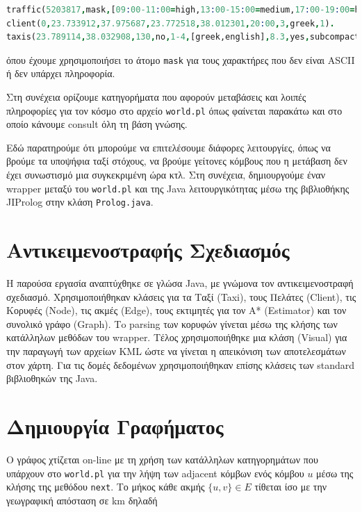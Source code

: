 \documentclass[a4paper,12pt]{article}
\begin{document}
\begin{lstlisting}[language=prolog]
traffic(5203817,mask,[09:00-11:00=high,13:00-15:00=medium,17:00-19:00=high], mask,mask).
client(0,23.733912,37.975687,23.772518,38.012301,20:00,3,greek,1).
taxis(23.789114,38.032908,130,no,1-4,[greek,english],8.3,yes,subcompact,mask).
\end{lstlisting}  

όπου έχουμε χρησιμοποιήσει το άτομο \texttt{mask} για τους χαρακτήρες που δεν είναι ASCII ή δεν υπάρχει πληροφορία. 

Στη συνέχεια ορίζουμε κατηγορήματα που αφορούν μεταβάσεις και λοιπές πληροφορίες για τον κόσμο στο αρχείο \texttt{world.pl} όπως φαίνεται παρακάτω και στο οποίο κάνουμε consult όλη τη βάση γνώσης. 



Εδώ παρατηρούμε ότι μπορούμε να επιτελέσουμε διάφορες λειτουργίες, όπως να βρούμε τα υποψήφια ταξί στόχους, να βρούμε γείτονες κόμβους που η μετάβαση δεν έχει συνωστισμό μια συγκεκριμένη ώρα κτλ. Στη συνέχεια, δημιουργούμε έναν wrapper μεταξύ του \texttt{world.pl} και της Java λειτουργικότητας μέσω της βιβλιοθήκης JIProlog στην κλάση \texttt{Prolog.java}. 

\section{Αντικειμενοστραφής Σχεδιασμός} 

Η παρούσα εργασία αναπτύχθηκε σε γλώσα Java, με γνώμονα τον αντικειμενοστραφή σχεδιασμό. Χρησιμοποιήθηκαν κλάσεις για τα Ταξί (Taxi), τους Πελάτες (Client), τις Κορυφές (Node), τις ακμές (Edge), τους εκτιμητές για τον Α* (Estimator) και τον συνολικό γράφο (Graph). Τo parsing των κορυφών γίνεται μέσω της κλήσης των κατάλληλων μεθόδων του wrapper. Τέλος χρησιμοποιήθηκε μια κλάση (Visual) για την παραγωγή των αρχείων KML ώστε να γίνεται η απεικόνιση των αποτελεσμάτων στον χάρτη. Για τις δομές δεδομένων χρησιμοποιήθηκαν επίσης κλάσεις των standard βιβλιοθηκών της Java. 

\section{Δημιουργία Γραφήματος}

Ο γράφος χτίζεται on-line με τη χρήση των κατάλληλων κατηγορημάτων που υπάρχουν στο \texttt{world.pl} για την λήψη των adjacent κόμβων ενός κόμβου $u$ μέσω της κλήσης της μεθόδου \texttt{next}. Το μήκος κάθε ακμής $\{u, v\} \in E$ τίθεται ίσο με την γεωγραφική απόσταση σε km δηλαδή 
\end{document}
